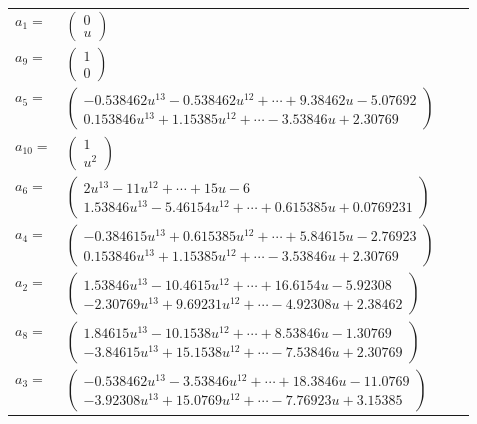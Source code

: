 \documentclass[1p]{elsarticle_modified}
\theoremstyle{definition}
\begin{document}
\begin{tabular}{m{7pt} m{180pt} m{7pt} m{180pt} }
\flushright $a_{1}=$&$\begin{pmatrix}0\\u\end{pmatrix}$ \\
\flushright $a_{9}=$&$\begin{pmatrix}1\\0\end{pmatrix}$ \\
\flushright $a_{5}=$&$\begin{pmatrix}-0.538462 u^{13}-0.538462 u^{12}+\cdots+9.38462 u-5.07692\\0.153846 u^{13}+1.15385 u^{12}+\cdots-3.53846 u+2.30769\end{pmatrix}$ \\
\flushright $a_{10}=$&$\begin{pmatrix}1\\u^2\end{pmatrix}$ \\
\flushright $a_{6}=$&$\begin{pmatrix}2 u^{13}-11 u^{12}+\cdots+15 u-6\\1.53846 u^{13}-5.46154 u^{12}+\cdots+0.615385 u+0.0769231\end{pmatrix}$ \\
\flushright $a_{4}=$&$\begin{pmatrix}-0.384615 u^{13}+0.615385 u^{12}+\cdots+5.84615 u-2.76923\\0.153846 u^{13}+1.15385 u^{12}+\cdots-3.53846 u+2.30769\end{pmatrix}$ \\
\flushright $a_{2}=$&$\begin{pmatrix}1.53846 u^{13}-10.4615 u^{12}+\cdots+16.6154 u-5.92308\\-2.30769 u^{13}+9.69231 u^{12}+\cdots-4.92308 u+2.38462\end{pmatrix}$ \\
\flushright $a_{8}=$&$\begin{pmatrix}1.84615 u^{13}-10.1538 u^{12}+\cdots+8.53846 u-1.30769\\-3.84615 u^{13}+15.1538 u^{12}+\cdots-7.53846 u+2.30769\end{pmatrix}$ \\
\flushright $a_{3}=$&$\begin{pmatrix}-0.538462 u^{13}-3.53846 u^{12}+\cdots+18.3846 u-11.0769\\-3.92308 u^{13}+15.0769 u^{12}+\cdots-7.76923 u+3.15385\end{pmatrix}$ \\

\end{tabular}
\end{document}
